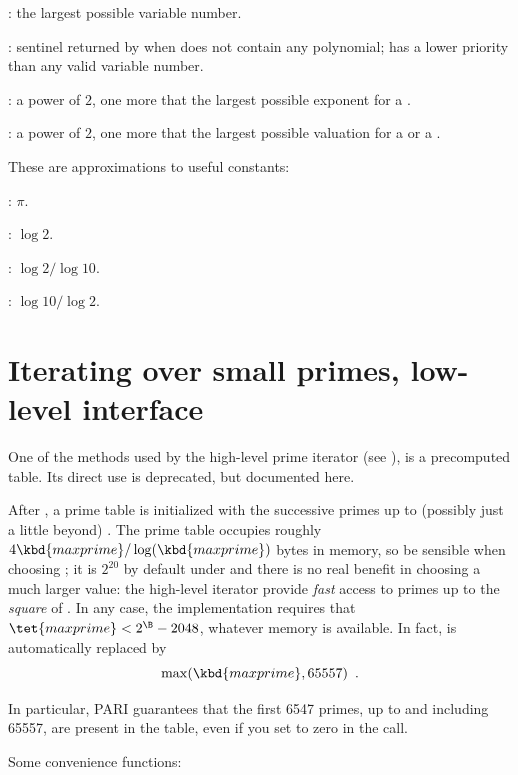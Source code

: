 \noindent {}: the largest possible variable number.

\noindent {}:  sentinel returned by  when 
does not contain any polynomial; has a lower priority than any valid variable
number.

\noindent {}: a power of $2$, one more that the largest possible
exponent for a .

\noindent {}: a power of $2$, one more that the largest possible
valuation for a  or a .


These are  approximations to useful constants:

\noindent {}: $\pi$.

\noindent {}: $\log 2$.

\noindent {}: $\log 2 / \log 10$.

\noindent {}: $\log 10 / \log 2$.

\section{Iterating over small primes, low-level interface}
\label{se:primetable}

One of the methods used by the high-level prime iterator (see
), is a precomputed table. Its direct use is deprecated,
but documented here.

After , a prime table  is
initialized with the successive primes up to (possibly
just a little beyond) . The prime table occupies roughly
$4 \kbd{maxprime}/\log(\kbd{maxprime})$ bytes in memory, so be sensible when
choosing ; it is $2^{20}$ by default under  and there
is no real benefit in choosing a much larger value: the high-level
iterator provide \emph{fast} access to primes up to the \emph{square}
of . In any case, the implementation requires that
$\tet{maxprime} < 2^{\B} - 2048$, whatever memory is available.
In fact,  is automatically replaced by
$$\max(\kbd{maxprime}, 65557)\enspace.$$

In particular, PARI guarantees that the first 6547 primes, up to and
including 65557, are present in the table, even if you set  to
zero in the  call.

\noindent Some convenience functions:

